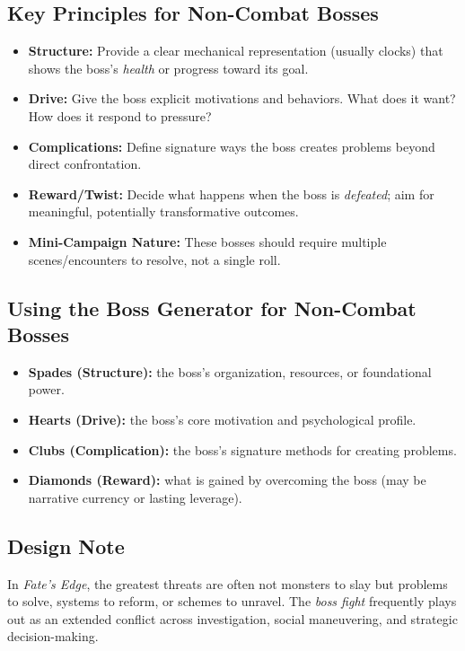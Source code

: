 \subsection*{Key Principles for Non-Combat Bosses}
\begin{itemize}
  \item \textbf{Structure:} Provide a clear mechanical representation (usually clocks) that shows the boss's \emph{health} or progress toward its goal.
  \item \textbf{Drive:} Give the boss explicit motivations and behaviors. What does it want? How does it respond to pressure?
  \item \textbf{Complications:} Define signature ways the boss creates problems beyond direct confrontation.
  \item \textbf{Reward/Twist:} Decide what happens when the boss is \emph{defeated}; aim for meaningful, potentially transformative outcomes.
  \item \textbf{Mini-Campaign Nature:} These bosses should require multiple scenes/encounters to resolve, not a single roll.
\end{itemize}

\subsection*{Using the Boss Generator for Non-Combat Bosses}
\begin{itemize}
  \item \textbf{Spades (Structure):} the boss's organization, resources, or foundational power.
  \item \textbf{Hearts (Drive):} the boss's core motivation and psychological profile.
  \item \textbf{Clubs (Complication):} the boss's signature methods for creating problems.
  \item \textbf{Diamonds (Reward):} what is gained by overcoming the boss (may be narrative currency or lasting leverage).
\end{itemize}

\subsection*{Design Note}
In \textit{Fate's Edge}, the greatest threats are often not monsters to slay but problems to solve, systems to reform, or schemes to unravel. The \emph{boss fight} frequently plays out as an extended conflict across investigation, social maneuvering, and strategic decision-making.

